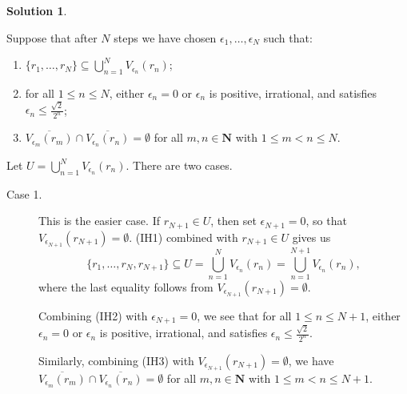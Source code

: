 \documentclass[12pt]{article}
\theoremstyle{definition}
\theoremstyle{exercise}
\theoremstyle{solution}
\newtheorem*{solution}{Solution}
\newcommand{\N}{\mathbf{N}}
\begin{document}
\begin{solution}
\begin{enumerate}
        Suppose that after \( N \) steps we have chosen \( \epsilon_1, \ldots, \epsilon_N \) such that:
        \begin{enumerate}[leftmargin=40pt, label=(IH\arabic*)]
            \item \( \{ r_1, \ldots, r_N \} \subseteq \bigcup_{n=1}^{N} V_{\epsilon_n}(r_n) \);

            \item for all \( 1 \leq n \leq N \), either \( \epsilon_n = 0 \) or \( \epsilon_n \) is positive, irrational, and satisfies \( \epsilon_n \leq \tfrac{\sqrt{2}}{2^n} \);

            \item \( \overline{V_{\epsilon_m}(r_m)} \cap \overline{V_{\epsilon_n}(r_n)} = \emptyset \) for all \( m, n \in \N \) with \( 1 \leq m < n \leq N \).
        \end{enumerate}
        
        Let \( U = \bigcup_{n=1}^N V_{\epsilon_n}(r_n) \). There are two cases.
        \begin{description}
            \item[Case 1.] This is the easier case. If \( r_{N+1} \in U \), then set \( \epsilon_{N+1} = 0 \), so that \( V_{\epsilon_{N+1}}(r_{N+1}) = \emptyset \). (IH1) combined with \( r_{N+1} \in U \) gives us
            \[
                \{ r_1, \ldots, r_N, r_{N+1} \} \subseteq U = \bigcup_{n=1}^N V_{\epsilon_n}(r_n) = \bigcup_{n=1}^{N+1} V_{\epsilon_n}(r_n),
            \]
            where the last equality follows from \( V_{\epsilon_{N+1}}(r_{N+1}) = \emptyset \).
            
            Combining (IH2) with \( \epsilon_{N+1} = 0 \), we see that for all \( 1 \leq n \leq N + 1 \), either \( \epsilon_n = 0 \) or \( \epsilon_n \) is positive, irrational, and satisfies \( \epsilon_n \leq \tfrac{\sqrt{2}}{2^n} \).

            Similarly, combining (IH3) with \( V_{\epsilon_{N+1}}(r_{N+1}) = \emptyset \), we have \( \overline{V_{\epsilon_m}(r_m)} \cap \overline{V_{\epsilon_n}(r_n)} = \emptyset \) for all \( m, n \in \N \) with \( 1 \leq m < n \leq N + 1 \).


\end{description}
\end{enumerate}
\end{solution}
\end{document}
